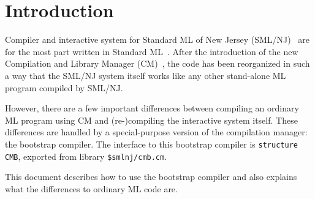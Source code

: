 
\section{Introduction}

Compiler and interactive system for Standard ML of New Jersey
(SML/NJ)~\cite{appel91:sml} are for the most part written in Standard
ML~\cite{milner97}.  After the introduction of the new Compilation and
Library Manager (CM)~\cite{blume00:newcm}, the code has been
reorganized in such a way that the SML/NJ system itself works like any
other stand-alone ML program compiled by SML/NJ.

However, there are a few important differences between compiling an
ordinary ML program using CM and (re-)compiling the interactive system
itself.  These differences are handled by a special-purpose version of
the compilation manager: the bootstrap compiler.  The interface to
this bootstrap compiler is {\tt structure CMB}, exported from library
{\tt \$smlnj/cmb.cm}.

This document describes how to use the bootstrap compiler and also
explains what the differences to ordinary ML code are.
